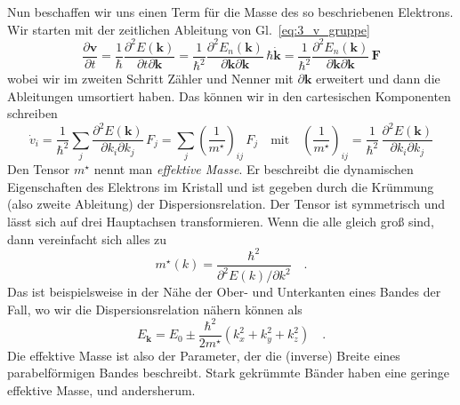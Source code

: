 Nun beschaffen wir uns einen Term für die Masse des so beschriebenen Elektrons. Wir starten mit der zeitlichen Ableitung von Gl.~\ref{eq:3_v_gruppe}
\begin{equation}
  \frac{\partial \mathbf{v}}{\partial t} = \frac{1}{\hbar}   \frac{\partial^2 E(\mathbf{k})}{\partial t \partial \mathbf{k}} 
  = \frac{1}{\hbar^2}   \frac{\partial^2 E_n(\mathbf{k})}{\partial \mathbf{k} \partial \mathbf{k}} \, \hbar \dot{\mathbf{k}}
  = \frac{1}{\hbar^2}   \frac{\partial^2 E_n(\mathbf{k})}{\partial \mathbf{k} \partial \mathbf{k}} \, \mathbf{F}
\end{equation}
wobei wir im zweiten Schritt Zähler und Nenner mit $\partial \mathbf{k}$ erweitert und dann die Ableitungen umsortiert haben. Das können wir in den cartesischen Komponenten schreiben
\begin{equation}
   \dot{v}_i =  \frac{1}{\hbar^2} \sum_j  \frac{\partial^2 E(\mathbf{k})}{\partial k_i \partial k_j} \, F_j
= \sum_j \left( \frac{1}{m^\star} \right)_{ij} \, F_j
\quad \text{mit} \quad 
\left( \frac{1}{m^\star} \right)_{ij}  =  \frac{1}{\hbar^2} \, \frac{\partial^2 E(\mathbf{k})}{\partial k_i \partial k_j}
\end{equation}
Den Tensor $m^\star$ nennt man \emph{effektive Masse}. Er beschreibt die dynamischen Eigenschaften des Elektrons im Kristall und ist gegeben durch die Krümmung (also zweite Ableitung) der Dispersionsrelation. Der Tensor ist symmetrisch und lässt sich auf drei Hauptachsen transformieren. Wenn die alle gleich groß sind, dann vereinfacht sich alles zu
\begin{equation}
   m^\star(k) = \frac{\hbar^2}{\partial ^2 E(k)/ \partial k^2} \quad .
\end{equation}
Das ist beispielsweise in der Nähe der Ober- und Unterkanten eines Bandes der Fall, wo wir die Dispersionsrelation nähern können als
\begin{equation}
   E_\mathbf{k} = E_0 \pm \frac{\hbar^2}{2 m^\star} \left(k_x^2 + k_y^2 + k_z^2 \right) \quad . \label{eq:3_parabel_band}
\end{equation}
Die effektive Masse ist also der Parameter, der die (inverse) Breite eines parabelförmigen Bandes beschreibt. Stark gekrümmte Bänder haben eine geringe effektive Masse, und andersherum.

